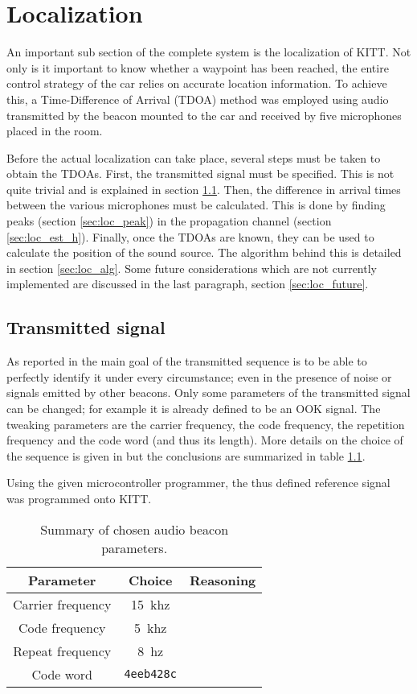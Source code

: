 \documentclass[11pt,titlepage]{report}
\begin{document}
\chapter{Localization}
An important sub section of the complete system is the localization of KITT. Not only is it important to know whether a waypoint has been reached, the entire control strategy of the car relies on accurate location information. To achieve this, a Time-Difference of Arrival (TDOA) method was employed using audio transmitted by the beacon mounted to the car and received by five microphones placed in the room.

Before the actual localization can take place, several steps must be taken to obtain the TDOAs. First, the transmitted signal must be specified. This is not quite trivial and is explained in section \ref{sec:loc_transmit}. Then, the difference in arrival times between the various microphones must be calculated. This is done by finding peaks (section \ref{sec:loc_peak}) in the propagation channel (section \ref{sec:loc_est_h}). Finally, once the TDOAs are known, they can be used to calculate the position of the sound source. The algorithm behind this is detailed in section \ref{sec:loc_alg}. Some future considerations which are not currently implemented are discussed in the last paragraph, section \ref{sec:loc_future}.

\section{Transmitted signal}
\label{sec:loc_transmit}
As reported in \cite{epo4-del7} the main goal of the transmitted sequence is to be able to perfectly identify it under every circumstance; even in the presence of noise or signals emitted by other beacons. Only some parameters of the transmitted signal can be changed; for example it is already defined to be an OOK signal. The tweaking parameters are the carrier frequency, the code frequency, the repetition frequency and the code word (and thus its length). More details on the choice of the sequence is given in \cite{epo4-del7} but the conclusions are summarized in table \ref{tab:loc_signal}.

Using the given microcontroller programmer, the thus defined reference signal was programmed onto KITT.

\begin{table}[H]
\centering
\begin{tabular}{c | c | c}
\hline \hline
Parameter & Choice & Reasoning \\
\hline
Carrier frequency & \SI{15}{khz} & \\
Code frequency & \SI{5}{khz} & \\
Repeat frequency & \SI{8}{hz} & \\
Code word & \texttt{4eeb428c} & \\
\end{tabular}
\caption{Summary of chosen audio beacon parameters.}
\label{tab:loc_signal}
\end{table}
\end{document}
